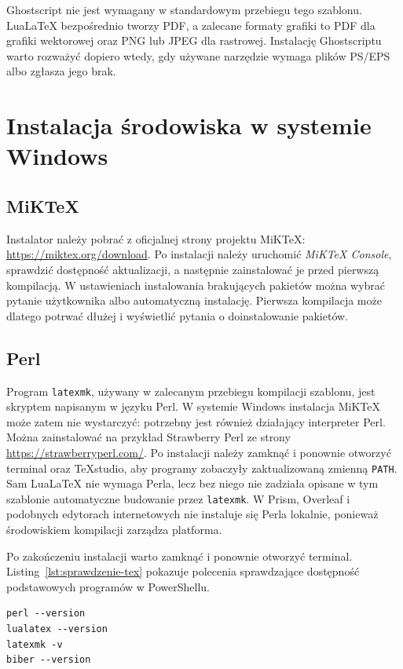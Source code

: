 Ghostscript nie jest wymagany w standardowym przebiegu tego szablonu. LuaLaTeX bezpośrednio tworzy PDF, a zalecane formaty grafiki to PDF dla grafiki wektorowej oraz PNG lub JPEG dla rastrowej. Instalację Ghostscriptu warto rozważyć dopiero wtedy, gdy używane narzędzie wymaga plików PS/EPS albo zgłasza jego brak.

\section{Instalacja środowiska w systemie Windows}

\subsection{MiKTeX}

Instalator należy pobrać z oficjalnej strony projektu MiKTeX: \url{https://miktex.org/download}. Po instalacji należy uruchomić \emph{MiKTeX Console}, sprawdzić dostępność aktualizacji, a następnie zainstalować je przed pierwszą kompilacją. W ustawieniach instalowania brakujących pakietów można wybrać pytanie użytkownika albo automatyczną instalację. Pierwsza kompilacja może dlatego potrwać dłużej i wyświetlić pytania o doinstalowanie pakietów.

\subsection{Perl}

Program \texttt{latexmk}, używany w zalecanym przebiegu kompilacji szablonu, jest skryptem napisanym w języku Perl. W systemie Windows instalacja MiKTeX może zatem nie wystarczyć: potrzebny jest również działający interpreter Perl. Można zainstalować na przykład Strawberry Perl ze strony \url{https://strawberryperl.com/}. Po instalacji należy zamknąć i ponownie otworzyć terminal oraz TeXstudio, aby programy zobaczyły zaktualizowaną zmienną \texttt{PATH}. Sam LuaLaTeX nie wymaga Perla, lecz bez niego nie zadziała opisane w tym szablonie automatyczne budowanie przez \texttt{latexmk}. W Prism, Overleaf i podobnych edytorach internetowych nie instaluje się Perla lokalnie, ponieważ środowiskiem kompilacji zarządza platforma.

Po zakończeniu instalacji warto zamknąć i ponownie otworzyć terminal. Listing~\ref{lst:sprawdzenie-tex} pokazuje polecenia sprawdzające dostępność podstawowych programów w PowerShellu.

\begin{lstlisting}[style=thesis-shell,caption={Sprawdzenie lokalnego środowiska TeX},label={lst:sprawdzenie-tex}]
perl --version
lualatex --version
latexmk -v
biber --version
\end{lstlisting}

